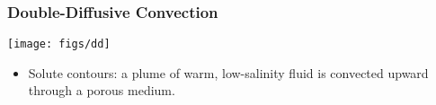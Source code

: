 \begin{frame}[t]
  \frametitle{Double-Diffusive Convection}
  \begin{center}
    \texttt{[image: figs/dd]}    
  \end{center}

  \begin{block}{}
    \begin{itemize}
    \item{Solute contours: a plume of
      warm, low-salinity fluid is convected upward through a porous medium.
      }
      \end{itemize}
  \end{block}
\end{frame}


